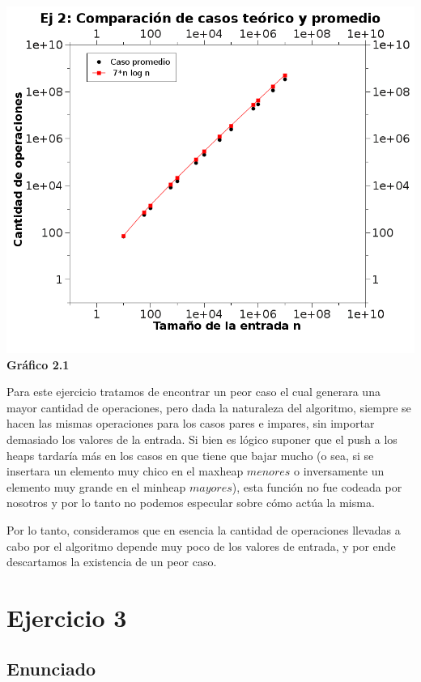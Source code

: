 \documentclass[a4paper, 10pt]{article}
\begin{document}
\begin{center}
\includegraphics[scale=0.50]{graficos/2-ej.png} \\
\scriptsize{\textsf{\textbf{Gr\'afico 2.1}}}  \\
\end{center}

Para este ejercicio tratamos de encontrar un peor caso el cual generara una mayor cantidad de operaciones, pero dada la naturaleza del algoritmo, siempre se hacen las mismas operaciones para los casos pares e impares, sin importar demasiado los valores de la entrada. Si bien es lógico suponer que el push a los heaps tardaría más en los casos en que tiene que bajar mucho (o sea, si se insertara un elemento muy chico en el maxheap $menores$ o inversamente un elemento muy grande en el minheap $mayores$), esta función no fue codeada por nosotros y por lo tanto no podemos especular sobre cómo actúa la misma.

Por lo tanto, consideramos que en esencia la cantidad de operaciones llevadas a cabo por el algoritmo depende muy poco de los valores de entrada, y por ende descartamos la existencia de un peor caso.

\newpage
\section{Ejercicio 3}

\subsection{Enunciado}
\end{document}
